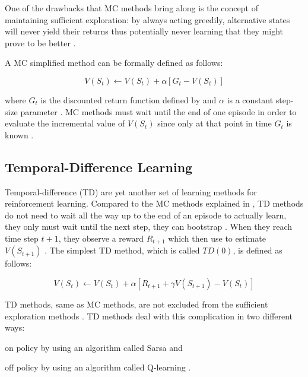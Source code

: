 \documentclass{seal_thesis}
\begin{document}
One of the drawbacks that MC methods bring along is the concept of maintaining sufficient exploration: by always acting greedily, alternative states will never yield their returns thus potentially never learning that they might prove to be better \cite[p. 123]{Sutton1998}.

A MC simplified method can be formally defined as follows:

\begin{equation}
	V(S_t) \leftarrow V(S_t) + \alpha [G_t - V(S_t)]
\end{equation}

where $G_t$ is the discounted return function defined by  and $\alpha$ is a constant step-size parameter \cite[p. 127]{Sutton1998}. MC methods must wait until the end of one episode in order to evaluate the incremental value of $V(S_t)$ since only at that point in time $G_t$ is known \cite[p. 128]{Sutton1998}.

\subsection{Temporal-Difference Learning}

Temporal-difference (TD) are yet another set of learning methods for reinforcement learning. Compared to the MC methods explained in , TD methods do not need to wait all the way up to the end of an episode to actually learn, they only must wait until the next step, \ie they can bootstrap \cite[p. 128]{Sutton1998}. When they reach time step $t+1$, they observe a reward $R_{t+1}$ which then use to estimate $V(S_{t+1})$ \cite[p. 128]{Sutton1998}. The simplest TD method, which is called $TD(0)$, is defined as follows:

\begin{equation}
	V(S_t) \leftarrow V(S_t) + \alpha [R_{t+1} + \gamma V(S_{t+1}) - V(S_t)]
\end{equation}

TD methods, same as MC methods, are not  excluded from the sufficient exploration methods \cite[p. 147]{Sutton1998}. TD methods deal with this complication in two different ways:
\begin{enumerate*}
	\item on policy by using an algorithm called Sarsa and
	\item off policy by using an algorithm called Q-learning \cite[p. 128]{Sutton1998}.
\end{enumerate*}
\end{document}
